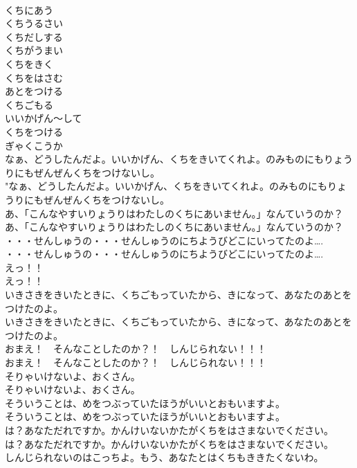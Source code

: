 \documentclass[8pt]{extreport}
\begin{document}
\begin{CJK}{UTF8}{min}
\\	くちにあう
\\	くちうるさい
\\	くちだしする
\\	くちがうまい
\\	くちをきく
\\	くちをはさむ
\\	あとをつける
\\	くちごもる
\\	いいかげん〜して
\\	くちをつける
\\	ぎゃくこうか
\\	なぁ、どうしたんだよ。いいかげん、くちをきいてくれよ。のみものにもりょうりにもぜんぜんくちをつけないし。	
\\	"なぁ、どうしたんだよ。いいかげん、くちをきいてくれよ。のみものにもりょうりにもぜんぜんくちをつけないし。 
\\	あ、「こんなやすいりょうりはわたしのくちにあいません。」なんていうのか？	
\\	あ、「こんなやすいりょうりはわたしのくちにあいません。」なんていうのか？ 
\\	・・・せんしゅうの・・・せんしゅうのにちようびどこにいってたのよ….	
\\	・・・せんしゅうの・・・せんしゅうのにちようびどこにいってたのよ…. 
\\	えっ！！	
\\	えっ！！ 
\\	いきさきをきいたときに、くちごもっていたから、きになって、あなたのあとをつけたのよ。	
\\	いきさきをきいたときに、くちごもっていたから、きになって、あなたのあとをつけたのよ。 
\\	おまえ！　そんなことしたのか？！　しんじられない！！！	
\\	おまえ！　そんなことしたのか？！　しんじられない！！！ 
\\	そりゃいけないよ、おくさん。	
\\	そりゃいけないよ、おくさん。 
\\	そういうことは、めをつぶっていたほうがいいとおもいますよ。	
\\	そういうことは、めをつぶっていたほうがいいとおもいますよ。 
\\	は？あなただれですか。かんけいないかたがくちをはさまないでください。	
\\	は？あなただれですか。かんけいないかたがくちをはさまないでください。 
\\	しんじられないのはこっちよ。もう、あなたとはくちもききたくないわ。	

\end{CJK}
\end{document}
